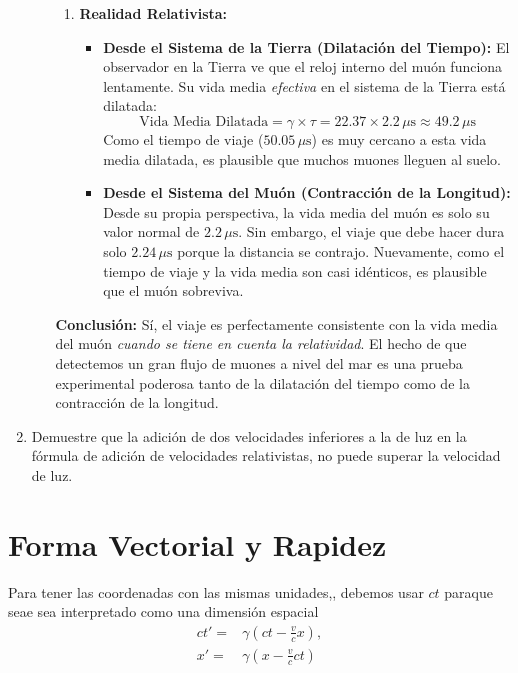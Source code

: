 \documentclass[11pt,a4paper]{article}
\begin{document}
\begin{enumerate}
\begin{itemize}
\begin{enumerate}
    \item \textbf{Realidad Relativista:}
    \begin{itemize}
        \item \textbf{Desde el Sistema de la Tierra (Dilatación del Tiempo):} El observador en la Tierra ve que el reloj interno del muón funciona lentamente. Su vida media \textit{efectiva} en el sistema de la Tierra está dilatada:
        \[ \text{Vida Media Dilatada} = \gamma \times \tau = 22.37 \times 2.2 \, \mu\text{s} \approx 49.2 \, \mu\text{s} \]
        Como el tiempo de viaje ($50.05 \, \mu\text{s}$) es muy cercano a esta vida media dilatada, es plausible que muchos muones lleguen al suelo.
        \item \textbf{Desde el Sistema del Muón (Contracción de la Longitud):} Desde su propia perspectiva, la vida media del muón es solo su valor normal de $2.2 \, \mu\text{s}$. Sin embargo, el viaje que debe hacer dura solo $2.24 \, \mu\text{s}$ porque la distancia se contrajo. Nuevamente, como el tiempo de viaje y la vida media son casi idénticos, es plausible que el muón sobreviva.
    \end{itemize}
\end{enumerate}
\textbf{Conclusión:} Sí, el viaje es perfectamente consistente con la vida media del muón \textit{cuando se tiene en cuenta la relatividad}. El hecho de que detectemos un gran flujo de muones a nivel del mar es una prueba experimental poderosa tanto de la dilatación del tiempo como de la contracción de la longitud.
\end{itemize}


\item Demuestre que la adición de dos velocidades inferiores a la de luz en la fórmula de adición de velocidades relativistas, no puede superar la velocidad de luz.



\end{enumerate}


\section{Forma Vectorial y Rapidez}

Para tener las coordenadas con las mismas unidades,, debemos usar $ct$ paraque seae sea interpretado como una dimensión espacial
\begin{align}
ct' =& \gamma\left(ct-\frac{v}{c}x\right),\\
x'=&\gamma\left(x-\frac{v}{c}ct\right)
\end{align}
\end{document}

